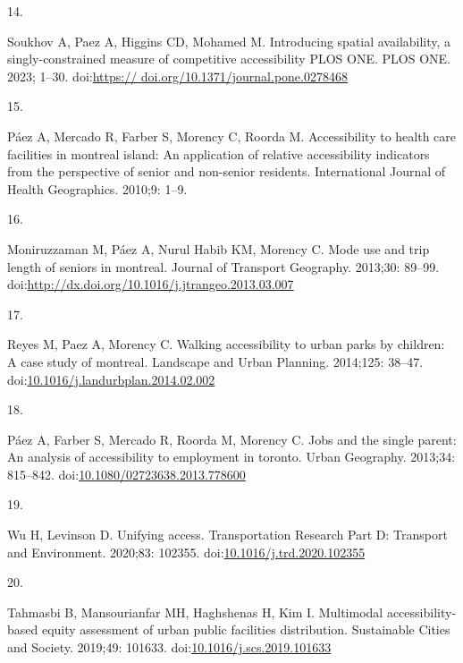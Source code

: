 \documentclass[10pt,letterpaper]{article}
\newlength{\cslhangindent}
\newlength{\csllabelwidth}
\newlength{\cslentryspacingunit} %
\newenvironment{CSLReferences}[2] %
 {%
  \setlength{\parindent}{0pt}
  \ifodd #1
  \let\oldpar\par
  \def\par{\hangindent=\cslhangindent\oldpar}
  \fi
  \setlength{\parskip}{#2\cslentryspacingunit}
 }%
 {}
\newcommand{\CSLLeftMargin}[1]{\parbox[t]{\csllabelwidth}{#1}}
\newcommand{\CSLRightInline}[1]{\parbox[t]{\linewidth - \csllabelwidth}{#1}\break}
\begin{document}
\begin{CSLReferences}{0}{0}
\leavevmode{}%
\CSLLeftMargin{14. }%
\CSLRightInline{Soukhov A, Paez A, Higgins CD, Mohamed M. Introducing
spatial availability, a singly-constrained measure of competitive
accessibility \textbar{} {PLOS ONE}. PLOS ONE. 2023; 1--30.
doi:\href{https://\%20doi.org/10.1371/journal.pone.0278468}{https://
doi.org/10.1371/journal.pone.0278468}}

\leavevmode{}%
\CSLLeftMargin{15. }%
\CSLRightInline{Páez A, Mercado R, Farber S, Morency C, Roorda M.
Accessibility to health care facilities in montreal island: An
application of relative accessibility indicators from the perspective of
senior and non-senior residents. International Journal of Health
Geographics. 2010;9: 1--9. }

\leavevmode{}%
\CSLLeftMargin{16. }%
\CSLRightInline{Moniruzzaman M, Páez A, Nurul Habib KM, Morency C. Mode
use and trip length of seniors in montreal. Journal of Transport
Geography. 2013;30: 89--99.
doi:\url{http://dx.doi.org/10.1016/j.jtrangeo.2013.03.007}}

\leavevmode{}%
\CSLLeftMargin{17. }%
\CSLRightInline{Reyes M, Paez A, Morency C. Walking accessibility to
urban parks by children: A case study of montreal. Landscape and Urban
Planning. 2014;125: 38--47.
doi:\href{https://doi.org/10.1016/j.landurbplan.2014.02.002}{10.1016/j.landurbplan.2014.02.002}}

\leavevmode{}%
\CSLLeftMargin{18. }%
\CSLRightInline{Páez A, Farber S, Mercado R, Roorda M, Morency C. Jobs
and the single parent: An analysis of accessibility to employment in
toronto. Urban Geography. 2013;34: 815--842.
doi:\href{https://doi.org/10.1080/02723638.2013.778600}{10.1080/02723638.2013.778600}}

\leavevmode{}%
\CSLLeftMargin{19. }%
\CSLRightInline{Wu H, Levinson D. Unifying access. Transportation
Research Part D: Transport and Environment. 2020;83: 102355.
doi:\href{https://doi.org/10.1016/j.trd.2020.102355}{10.1016/j.trd.2020.102355}}

\leavevmode{}%
\CSLLeftMargin{20. }%
\CSLRightInline{Tahmasbi B, Mansourianfar MH, Haghshenas H, Kim I.
Multimodal accessibility-based equity assessment of urban public
facilities distribution. Sustainable Cities and Society. 2019;49:
101633.
doi:\href{https://doi.org/10.1016/j.scs.2019.101633}{10.1016/j.scs.2019.101633}}


\end{CSLReferences}
\end{document}
